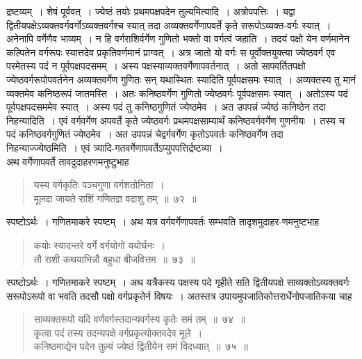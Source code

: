 \documentclass[11pt, openany]{book}
\begin{document}
\noindent द्रष्टव्यम्~। शेषं पूर्ववत्~। ज्येष्ठं तयोः प्रथमपक्षपदेन तुल्यमित्यादि~।
अत्रोपपत्तिः~। यद्वा द्वितीयपक्षेऽव्यक्तवर्गवर्गोऽव्यक्तवर्गश्च स्यात् तदा अव्यक्तवर्गेणापवर्ते कृते सरूपोऽव्यक्त-वर्गः स्यात्~। अनेनापि वर्गेणैव भाव्यम्~। न हि वर्गराशिर्वर्गेण गुणितो भक्तो वा वर्गत्वं जहाति~। तदयं पक्षो येन वर्णमानेन कल्पितेन वर्गरूपः स्यात्तदेव प्रकृतिवर्णमानं प्राग्वत्~। अत्र जातो यो वर्गः स पूर्वोक्तयुक्त्या ज्येष्ठवर्ग एव परमेतस्य पदं न पूर्वपक्षपदसमम्~। अस्य पक्षस्याव्यक्तवर्गेणापवर्तनात्~। अतो सापवर्तितपक्षो ज्येष्ठवर्गरूपोपवर्तनेन अव्यक्तवर्गेण गुणितः सन् यथास्थितः स्यादिति 
पूर्वपक्षसमः स्यात्~। अव्यक्तस्य तु मानं व्यक्तमेव कनिष्ठरूपं 
जातमस्ति~। अतः कनिष्ठवर्गेण गुणितो ज्येष्ठवर्गः पूर्वपक्षसमः 
स्यात्~। अतोऽस्य पदं पूर्वपक्षपदसममेव स्यात्~। अस्य पदं तु 
कनिष्ठगुणितं ज्येष्ठमेव~। अत उपपन्नं ज्येष्ठं कनिष्ठेन तदा निहन्यादिति~।
एवं वर्गवर्गेण अपवर्ते कृते ज्येष्ठवर्गः प्रथमपक्षसाम्यार्थं कनिष्ठवर्गवर्गेण 
गुणनीयः~। तस्य च पदं कनिष्ठवर्गगुणितं ज्येष्ठमेव~। अत उपपन्नं 
चेद्वर्गवर्गेण कृतोऽपवर्तः कनिष्ठवर्गेण तदा निहन्याज्ज्येष्ठमिति~। एवं
त्र्यादि-गतवर्गेणापवर्तेऽप्युपपत्तिर्द्रष्टव्या~। \\

\vspace{-3mm}
 अथ वर्गेणापवर्ते तावदुदाहरणमनुष्टुभाह\textendash 
 \begin{quote}
     \ex
       यस्य वर्गकृतिः पञ्चगुणा वर्गशतोनिता~। \\
 मूलदा जायते राशिं गणितज्ञ वदाशु तम्~॥~७२~॥~
 \end{quote}

स्पष्टोऽर्थः~। गणितमाकरे स्पष्टम्~। अथ यत्र वर्गवर्गेणापवर्तः सम्भवति 
तादृशमुदाहर-णमनुष्टभाह\textendash
 \begin{quote}
     \ex
 कयोः स्यादन्तरे वर्गे वर्गयोगो ययोर्घनः~। \\
 तौ राशी कथयाभिन्नौ बहुधा बीजवित्तम~॥~७३~॥~
 \end{quote}

स्पष्टोऽर्थः~। गणितमाकरे स्पष्टम्~। अथ यत्रैकस्य पक्षस्य पदे गृहीते सति
 \newpage
\noindent द्वितीयपक्षे साव्यक्तोऽव्यक्तवर्गः सरूपोऽरूपो वा भवति तदसौ पक्षो
वर्गप्रकृतेर्न विषयः~। अतस्तत्र उपायमुपजातिकोत्तरार्धेनोपजातिकया चाह\textendash
\begin{quote}
    \bs
     साव्यक्तरूपो यदि वर्णवर्गस्तदान्यवर्गस्य कृतेः समं तम्~॥~७४~॥\\

\vspace{-5mm}
 कृत्वा पदं तस्य तदन्यपक्षे वर्गप्रकृत्योक्तवदेव मूले~। \\
 कनिष्ठमाद्येन पदेन तुल्यं ज्येष्ठं द्वितीयेन समं विदध्यात्~॥~७५~॥
\end{quote}
\end{document}

